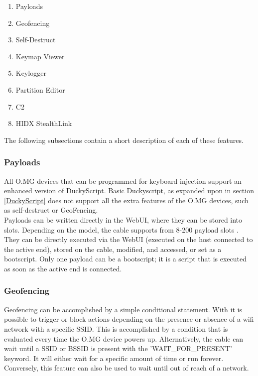 \begin{enumerate}
    \item Payloads
    \item Geofencing
    \item Self-Destruct
    \item Keymap Viewer
    \item Keylogger
    \item Partition Editor
    \item C2
    \item HIDX StealthLink
\end{enumerate}

The following subsections contain a short description of each of these features. 

\subsubsection{Payloads}

All O.MG devices that can be programmed for keyboard injection support an enhanced version of DuckyScript. Basic Duckyscript, as expanded upon in section \ref{DuckyScript} does not support all the extra features of the O.MG devices, such as self-destruct or GeoFencing. \\
Payloads can be written directly in the WebUI, where they can be stored into slots. Depending on the model, the cable supports from 8-200 payload slots \cite{hak5MGCable}. They can be directly executed via the WebUI (executed on the host connected to the active end), stored on the cable, modified, and accessed, or set as a bootscript. Only one payload can be a bootscript; it is a script that is executed as soon as the active end is connected. \\



\subsubsection{Geofencing}

Geofencing can be accomplished by a simple conditional statement. With it is possible to trigger or block actions depending on the presence or absence of a wifi network with a specific SSID. This is accomplished by a condition that is evaluated every time the O.MG device powers up. Alternatively, the cable can wait until a SSID or BSSID is present with the 'WAIT\_FOR\_PRESENT' keyword.
It will either wait for a specific amount of time or run forever. Conversely, this feature can also be used to wait until out of reach of a network.

